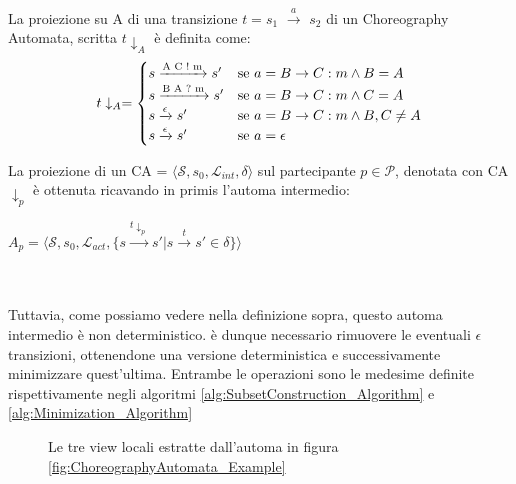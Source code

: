 \begin{definition}[Proiezione]
    La proiezione su A di una transizione $t = s_1$ $\xrightarrow{a}$ $s_2$ di un Choreography Automata, scritta $t\downarrow_{A}$ è definita come:
    \begin{equation*}
        t \downarrow_{A} =
        \begin{cases}
            s \xrightarrow{\text{A C ! m}} s' & $se $ a = B \rightarrow C : m \wedge B = A       \\
            s \xrightarrow{\text{B A ? m}} s' & $se $ a = B \rightarrow C : m \wedge C = A       \\
            s \xrightarrow{\epsilon} s'       & $se $ a = B \rightarrow C : m \wedge B, C \neq A \\
            s \xrightarrow{\epsilon} s'       & $se $ a = \epsilon
        \end{cases}
    \end{equation*}
\end{definition}
La proiezione di un CA = $\langle \mathcal{S}, s_0, \mathcal{L}_{int}, \delta \rangle$ sul partecipante $p \in \mathcal{P}$, denotata con CA$\downarrow_p$ è ottenuta ricavando in primis l'automa intermedio:
\bigskip \\
\centerline{$A_p = \langle \mathcal{S}, s_0, \mathcal{L}_{act}, \{ s \xrightarrow{t\downarrow_{p}} s' | s \xrightarrow{t} s' \in \delta \} \rangle$}
\\ \\
Tuttavia, come possiamo vedere nella definizione sopra, questo automa intermedio è non deterministico. è dunque necessario rimuovere le eventuali $\epsilon$ transizioni, ottenendone una versione deterministica e successivamente minimizzare quest'ultima. Entrambe le operazioni sono le medesime definite rispettivamente negli algoritmi \ref{alg:SubsetConstruction_Algorithm} e \ref{alg:Minimization_Algorithm}

\begin{figure}[ht]
    \centering
    \caption{Le tre view locali estratte dall'automa in figura \ref{fig:ChoreographyAutomata_Example}}
    \label{fig:Projection_Example}
\end{figure}


